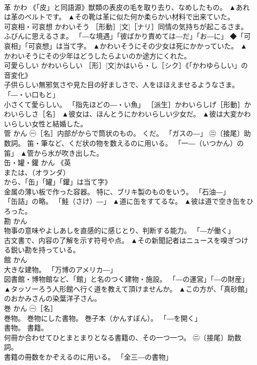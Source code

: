 \documentclass[8pt]{extreport}
\begin{document}
\begin{CJK}{UTF8}{min}
\\	革	かわ	《「皮」と同語源》獣類の表皮の毛を取り去り、なめしたもの。	▲あれは革のベルトです。 ▲その靴は革に似た何か柔らかい材料で出来ていた。
\\	可哀相・可哀想	かわいそう	［形動］[文]［ナリ］同情の気持ちが起こるさま。 ふびんに思えるさま。 「―な境遇」「彼ばかり責めては―だ」「お―に」 ◆「可哀相」「可哀想」は当て字。	▲かわいそうにその少女は死にかかっていた。 ▲かわいそうにその少年はどうしたらよいのか途方にくれた。
\\	可愛らしい	かわいらしい	［形］[文]かはいら・し［シク］《「かわゆらしい」の音変化》 
\\	子供らしい無邪気さや見た目の好ましさで、人をほほえませるようなさま。 「―・い口もと」 
\\	小さくて愛らしい。 「指先ほどの―・い魚」 ［派生］かわいらしげ［形動］かわいらしさ［名］	▲彼女は、ほんとうにかわいらしい少女だ。 ▲彼は大変かわいらしい女性と結婚した。
\\	管	かん	㊀［名］内部がからで筒状のもの。 くだ。 「ガスの―」 ㊁〔接尾〕助数詞。 笛・筆など、くだ状の物を数えるのに用いる。 「一―（いつかん）の笛」	▲管から水が吹き出した。
\\	缶・罐・鑵	かん	《英
\\	または、（オランダ）
\\	から、「缶」「罐」「鑵」は当て字》 
\\	金属の薄い板で作った容器。 特に、ブリキ製のものをいう。 「石油―」 
\\	「缶詰」の略。 「鮭（さけ）―」	▲道に缶をすてるな。 ▲彼は道で空き缶をひろった。
\\	勘	かん	
\\	物事の意味やよしあしを直感的に感じとり、判断する能力。 「―が働く」 
\\	古文書で、内容の了解を示す符号や点。	▲その新聞記者はニュースを嗅ぎつける鋭い勘を持っている。
\\	館	かん	
\\	大きな建物。 「万博のアメリカ―」 
\\	図書館・博物館など、「館」と名のつく建物・施設。 「―の運営」「―の財産」	▲タッソーろう人形館へ行く道を教えて頂けませんか。 ▲この方が、「真砂館」のおかみさんの染葉洋子さん。
\\	巻	かん	㊀［名］ 
\\	巻物。 巻物にした書物。 巻子本（かんすぼん）。 「―を開く」 
\\	書物。 書籍。 
\\	何冊か合わせてひとまとまりとなる書籍の、その一つ一つ。 ㊁〔接尾〕助数詞。 
\\	書籍の冊数をかぞえるのに用いる。 「全三―の書物」 

\end{CJK}
\end{document}
